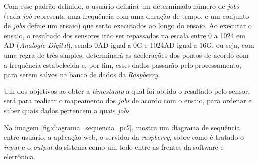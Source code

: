 Com esse padrão definido, o usuário definirá um determinado número de \textit{jobs} (cada \textit{job} representa uma frequência com uma duração de tempo, e um conjunto de \textit{jobs} define um ensaio) que serão executados ao longo do ensaio. Ao executar o ensaio, o resultado dos sensores irão ser repassados na escala entre 0 a 1024 em AD (\textit{Analogic Digital}), sendo 0AD igual a 0G e 1024AD igual a 16G, ou seja, com uma regra de três simples, determinará as acelerações dos pontos de acordo com a frequência estabelecida e, por fim, esses dados passarão pelo processamento, para serem salvos no banco de dados da \textit{Raspberry}.

Um dos objetivos ao obter a \textit{timestamp} a qual foi obtido o resultado pelo sensor, será para realizar o mapeamento dos \textit{jobs} de acordo com o ensaio, para ordenar e saber quais dados pertencem a quais \textit{jobs}.

Na imagem \ref{fig:diagrama_sequencia_pc2}, mostra um diagrama de sequência entre usuário, a aplicação web, o servidor da \textit{raspberry}, sobre como é tratado o \textit{input} e o \textit{output} do sistema como um todo entre as frentes da software e eletrônica.

